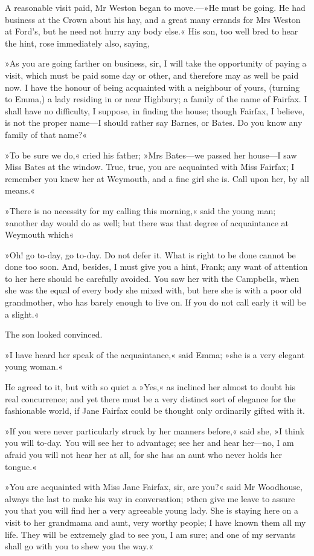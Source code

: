 A reasonable visit paid, Mr Weston began to move.—»He must be going. He had business at the Crown about his hay, and a great many errands for Mrs Weston at Ford's, but he need not hurry any body else.« His son, too well bred to hear the hint, rose immediately also, saying,

»As you are going farther on business, sir, I will take the opportunity of paying a visit, which must be paid some day or other, and therefore may as well be paid now. I have the honour of being acquainted with a neighbour of yours, (turning to Emma,) a lady residing in or near Highbury; a family of the name of Fairfax. I shall have no difficulty, I suppose, in finding the house; though Fairfax, I believe, is not the proper name—I should rather say Barnes, or Bates. Do you know any family of that name?«

»To be sure we do,« cried his father; »Mrs Bates—we passed her house—I saw Miss Bates at the window. True, true, you are acquainted with Miss Fairfax; I remember you knew her at Weymouth, and a fine girl she is. Call upon her, by all means.«

»There is no necessity for my calling this morning,« said the young man; »another day would do as well; but there was that degree of acquaintance at Weymouth which\longdash«

»Oh! go to-day, go to-day. Do not defer it. What is right to be done cannot be done too soon. And, besides, I must give you a hint, Frank; any want of attention to her here should be carefully avoided. You saw her with the Campbells, when she was the equal of every body she mixed with, but here she is with a poor old grandmother, who has barely enough to live on. If you do not call early it will be a slight.«

The son looked convinced.

»I have heard her speak of the acquaintance,« said Emma; »she is a very elegant young woman.«

He agreed to it, but with so quiet a »Yes,« as inclined her almost to doubt his real concurrence; and yet there must be a very distinct sort of elegance for the fashionable world, if Jane Fairfax could be thought only ordinarily gifted with it.

»If you were never particularly struck by her manners before,« said she, »I think you will to-day. You will see her to advantage; see her and hear her—no, I am afraid you will not hear her at all, for she has an aunt who never holds her tongue.«

»You are acquainted with Miss Jane Fairfax, sir, are you?« said Mr Woodhouse, always the last to make his way in conversation; »then give me leave to assure you that you will find her a very agreeable young lady. She is staying here on a visit to her grandmama and aunt, very worthy people; I have known them all my life. They will be extremely glad to see you, I am sure; and one of my servants shall go with you to shew you the way.«

